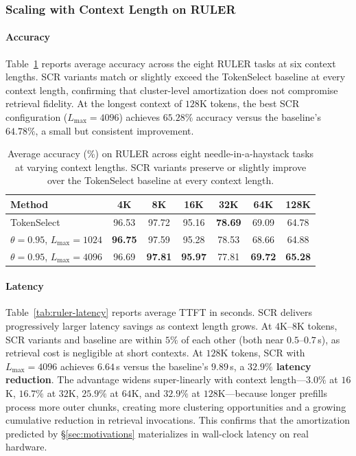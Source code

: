 \documentclass[10pt,conference]{IEEEtran}
\begin{document}
\subsubsection{Scaling with Context Length on RULER}
\label{subsec:exp-ruler}

\paragraph{Accuracy} 
Table~\ref{tab:ruler-accuracy} reports average accuracy across the 
eight RULER tasks at six context lengths. SCR variants match or 
slightly exceed the TokenSelect baseline at every context length, 
confirming that cluster-level amortization does not compromise 
retrieval fidelity. At the longest context of $128$K tokens, the
best SCR configuration ($L_{\max} = 4096$) achieves
$65.28\%$ accuracy versus the baseline's $64.78\%$, a small but
consistent improvement.

\begin{table}[t]
\centering
\caption{Average accuracy (\%) on RULER across eight 
needle-in-a-haystack tasks at varying context lengths. SCR variants 
preserve or slightly improve over the TokenSelect baseline at every 
context length.}
\label{tab:ruler-accuracy}
\footnotesize
\setlength{\tabcolsep}{4pt}
\begin{tabular}{lcccccc}
\toprule
\textbf{Method} & \textbf{4K} & \textbf{8K} & \textbf{16K} & \textbf{32K} & \textbf{64K} & \textbf{128K} \\
\midrule
TokenSelect                            & 96.53 & 97.72 & 95.16 & \textbf{78.69} & 69.09 & 64.78 \\
\midrule
$\theta\!=\!0.95$, $L_{\max}\!=\!1024$      & \textbf{96.75} & 97.59 & 95.28 & 78.53 & 68.66 & 64.88 \\
$\theta\!=\!0.95$, $L_{\max}\!=\!4096$      & 96.69 & \textbf{97.81} & \textbf{95.97} & 77.81 & \textbf{69.72} & \textbf{65.28} \\
\bottomrule
\end{tabular}
\end{table}

\paragraph{Latency} 
Table~\ref{tab:ruler-latency} reports average TTFT in seconds. SCR 
delivers progressively larger latency savings as context length grows. 
At $4$K--$8$K tokens, SCR variants and baseline are within $5\%$ of 
each other (both near $0.5$--$0.7$\,s), as retrieval cost is 
negligible at short contexts. At $128$K tokens, SCR with 
$L_{\max} = 4096$ achieves $6.64$\,s versus the baseline's $9.89$\,s, 
a \textbf{$32.9\%$ latency reduction}. The advantage widens
super-linearly with context length---$3.0\%$ at $16$K, $16.7\%$ at
$32$K, $25.9\%$ at $64$K, and $32.9\%$ at $128$K---because longer
prefills process more outer chunks, creating more clustering
opportunities and a growing cumulative reduction in retrieval
invocations. This confirms that the amortization predicted by
§\ref{sec:motivations} materializes in wall-clock latency on real
hardware.
\end{document}
